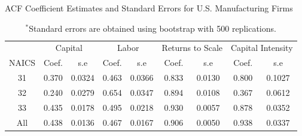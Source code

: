 \documentclass[12pt]{article}
\begin{document}
\begin{table}[H]
\centering
\caption{ACF Coefficient Estimates and Standard Errors for U.S. Manufacturing Firms}
\small
\begin{tabular}{ccccccccc}
  \hline\hline & \multicolumn{2}{c}{Capital} & \multicolumn{2}{c}{Labor} & \multicolumn{2}{c}{Returns to Scale} & \multicolumn{2}{c}{Capital Intensity}\\ \cmidrule(lr){2-3} \cmidrule(lr){4-5} \cmidrule(lr){6-7} \cmidrule(lr){8-9}NAICS & Coef. & s.e & Coef. & s.e & Coef. & s.e & Coef. & s.e \\ 
  \hline
31 & 0.370 & 0.0324 & 0.463 & 0.0366 & 0.833 & 0.0130 & 0.800 & 0.1027 \\ 
  32 & 0.240 & 0.0279 & 0.654 & 0.0347 & 0.894 & 0.0108 & 0.367 & 0.0612 \\ 
  33 & 0.435 & 0.0178 & 0.495 & 0.0218 & 0.930 & 0.0057 & 0.878 & 0.0352 \\ 
  All & 0.438 & 0.0136 & 0.467 & 0.0167 & 0.906 & 0.0050 & 0.938 & 0.0337 \\ 
   \hline
\end{tabular}
\caption*{\footnotesize $^{*}$Standard errors are obtained using bootstrap with 500 replications.}
\label{USACF}
\end{table}
\end{document}

